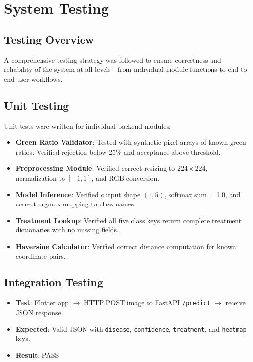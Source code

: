 \documentclass[12pt,a4paper]{report}
\begin{document}
\chapter{System Testing}

\section{Testing Overview}
A comprehensive testing strategy was followed to ensure correctness and reliability of the system at all levels---from individual module functions to end-to-end user workflows.

\section{Unit Testing}
Unit tests were written for individual backend modules:
\begin{itemize}
    \item \textbf{Green Ratio Validator}: Tested with synthetic pixel arrays of known green ratios. Verified rejection below 25\% and acceptance above threshold.
    \item \textbf{Preprocessing Module}: Verified correct resizing to $224 \times 224$, normalization to $[-1, 1]$, and RGB conversion.
    \item \textbf{Model Inference}: Verified output shape $(1, 5)$, softmax sum = 1.0, and correct argmax mapping to class names.
    \item \textbf{Treatment Lookup}: Verified all five class keys return complete treatment dictionaries with no missing fields.
    \item \textbf{Haversine Calculator}: Verified correct distance computation for known coordinate pairs.
\end{itemize}

\section{Integration Testing}
\begin{itemize}
    \item \textbf{Test}: Flutter app $\rightarrow$ HTTP POST image to FastAPI \texttt{/predict} $\rightarrow$ receive JSON response.
    \item \textbf{Expected}: Valid JSON with \texttt{disease}, \texttt{confidence}, \texttt{treatment}, and \texttt{heatmap} keys.
    \item \textbf{Result}: PASS
\end{itemize}
\end{document}
